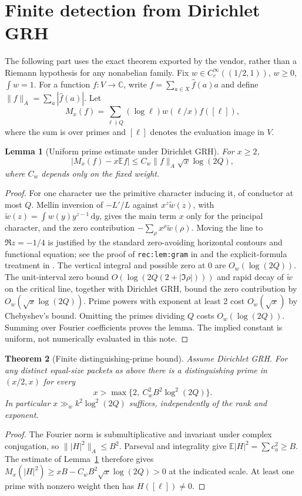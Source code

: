 \documentclass[11pt]{article}
\newtheorem{theorem}{Theorem}[section]
\newtheorem{lemma}[theorem]{Lemma}
\theoremstyle{definition}\newtheorem{definition}[theorem]{Definition}
\theoremstyle{remark}\newtheorem{remark}[theorem]{Remark}
\newcommand{\C}{\mathbb C}
\newcommand{\E}{\mathbb E}
\newcommand{\dd}{\,\mathrm d}
\begin{document}
\section{Finite detection from Dirichlet GRH}\label{sec:grh}
The following part uses the exact theorem exported by the vendor, rather than a Riemann hypothesis for any nonabelian family. Fix $w\in C_c^\infty((1/2,1))$, $w\ge0$, $\int w=1$. For a function $f:V\to\C$, write $f=\sum_{a\in X}\widehat f(a)a$ and define $\|f\|_A=\sum_a|\widehat f(a)|$. Let
\[
 M_x(f)=\sum_{\ell\nmid Q}(\log\ell)w(\ell/x)f([\ell]),
\]
where the sum is over primes and $[\ell]$ denotes the evaluation image in $V$.
\begin{lemma}[Uniform prime estimate under Dirichlet GRH]\label{lem:prime}
For $x\ge2$,
\[|M_x(f)-x\E f|\le C_w\|f\|_A\sqrt{x}\log(2Q),\]
where $C_w$ depends only on the fixed weight.
\end{lemma}
\begin{proof}
For one character use the primitive character inducing it, of conductor at most $Q$. Mellin inversion of $-L'/L$ against $x^z\widetilde w(z)$, with $\widetilde w(z)=\int w(y)y^{z-1}\dd y$, gives the main term $x$ only for the principal character, and the zero contribution $-\sum_\rho x^\rho\widetilde w(\rho)$. Moving the line to $\Re z=-1/4$ is justified by the standard zero-avoiding horizontal contours and functional equation; see the proof of \texttt{rec:lem:gram} in \cite{article} and the explicit-formula treatment in \cite{Davenport}. The vertical integral and possible zero at 0 are $O_w(\log(2Q))$. The unit-interval zero bound $O(\log(2Q(2+|\Im\rho|)))$ and rapid decay of $\widetilde w$ on the critical line, together with Dirichlet GRH, bound the zero contribution by $O_w(\sqrt{x}\log(2Q))$. Prime powers with exponent at least 2 cost $O_w(\sqrt{x})$ by Chebyshev's bound. Omitting the primes dividing $Q$ costs $O_w(\log(2Q))$. Summing over Fourier coefficients proves the lemma. The implied constant is uniform, not numerically evaluated in this note.
\end{proof}
\begin{theorem}[Finite distinguishing-prime bound]\label{thm:detect}
Assume Dirichlet GRH. For any distinct equal-size packets as above there is a distinguishing prime in $(x/2,x)$ for every
\[
 x>\max\{2,\ C_w^2 B^2\log^2(2Q)\}.
\]
In particular $x\gg_w k^2\log^2(2Q)$ suffices, independently of the rank and exponent.
\end{theorem}
\begin{proof}
The Fourier norm is submultiplicative and invariant under complex conjugation, so $\||H|^2\|_A\le B^2$. Parseval and integrality give $\E|H|^2=\sum c_a^2\ge B$. The estimate of Lemma~\ref{lem:prime} therefore gives $M_x(|H|^2)\ge xB-C_w B^2\sqrt{x}\log(2Q)>0$ at the indicated scale. At least one prime with nonzero weight then has $H([\ell])\ne0$.
\end{proof}
\end{document}
